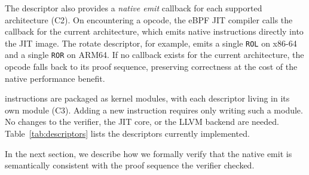 The descriptor also provides a \emph{native emit} callback for each supported architecture (C2). On encountering a \lang opcode, the eBPF JIT compiler calls the callback for the current architecture, which emits native instructions directly into the JIT image. The rotate descriptor, for example, emits a single \texttt{ROL} on x86-64 and a single \texttt{ROR} on ARM64. If no callback exists for the current architecture, the opcode falls back to its proof sequence, preserving correctness at the cost of the native performance benefit.

\lang instructions are packaged as kernel modules, with each descriptor living in its own module (C3). Adding a new instruction requires only writing such a module. No changes to the verifier, the JIT core, or the LLVM backend are needed. Table~\ref{tab:descriptors} lists the  descriptors currently implemented.



In the next section, we describe how we formally verify that the native emit is semantically consistent with the proof sequence the verifier checked.